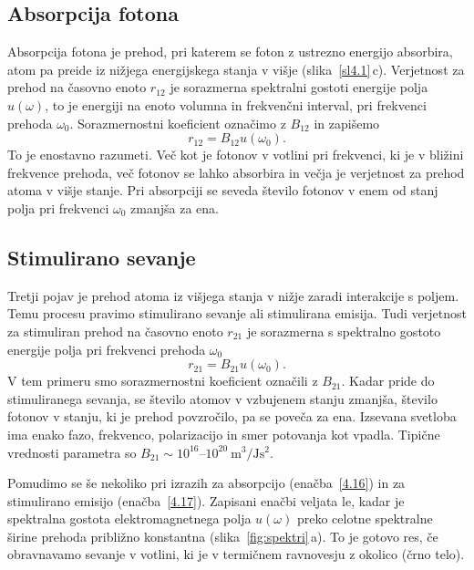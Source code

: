 \subsection*{Absorpcija fotona}
Absorpcija fotona je prehod, pri katerem se foton 
z ustrezno energijo absorbira, atom pa preide iz nižjega energijskega stanja v višje (slika~\ref{sl4.1}\,c). 
Verjetnost za prehod na časovno enoto $r_{12}$ je sorazmerna 
spektralni gostoti energije polja $u(\omega)$, to je
energiji na enoto volumna in frekvenčni interval, 
pri frekvenci prehoda $\omega_{0}$. Sorazmernostni koeficient označimo z $B_{12}$ in 
zapišemo
\begin{equation}
r_{12}=B_{12}u(\omega_{0}).
\label{4.16}
\end{equation}
To je enostavno razumeti. Več kot je fotonov v votlini pri frekvenci, ki je
v bližini frekvence prehoda, več fotonov se lahko absorbira in večja je 
verjetnost za prehod atoma v višje stanje. Pri absorpciji se
seveda število fotonov v enem od stanj polja pri frekvenci
$\omega_{0}$ zmanjša za ena.

\subsection*{Stimulirano sevanje}
Tretji pojav je prehod atoma iz višjega stanja v nižje zaradi interakcije
s poljem. Temu procesu pravimo stimulirano sevanje ali 
stimulirana emisija. Tudi verjetnost za stimuliran prehod na časovno enoto $r_{21}$ 
je sorazmerna s spektralno gostoto energije polja pri frekvenci prehoda $\omega_{0}$
\begin{equation}
r_{21}=B_{21}u(\omega_{0}).
\label{4.17}
\end{equation}
V tem primeru smo sorazmernostni koeficient označili z $B_{21}$. Kadar pride do
stimuliranega sevanja, se število atomov v vzbujenem stanju zmanjša, 
število fotonov v stanju, ki je prehod povzročilo, pa se poveča za ena. 
Izsevana svetloba ima enako fazo, frekvenco, polarizacijo in smer potovanja kot 
vpadla. Tipične vrednosti parametra so $B_{21} \sim 10^{16}$--$10^{20}~\si{\metre^3/\joule\second^2}$.

Pomudimo se še nekoliko pri izrazih za absorpcijo
(enačba~\ref{4.16}) in za stimulirano emisijo (enačba~\ref{4.17}).
Zapisani enačbi veljata le, kadar je spektralna gostota 
elektromagnetnega polja $u(\omega)$
preko celotne spektralne širine prehoda približno konstantna 
(slika~\ref{fig:spektri}\,a). To je gotovo res, če
obravnavamo sevanje v votlini, ki je v termičnem ravnovesju z okolico (črno telo).

